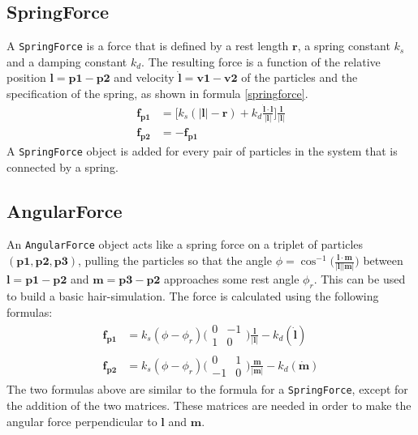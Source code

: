 \documentclass[a4paper,twoside,11pt,twocolumn]{article}
\begin{document}
\subsection{SpringForce}
A \texttt{SpringForce} is a force that is defined by a rest length $\mathbf{r}$, a spring constant $k_s$ and a damping constant $k_d$. The resulting force is a function of the relative position $\mathbf{l = p1 - p2}$ and velocity $\mathbf{\dot{l} = v1 - v2}$ of the particles and the specification of the spring, as shown in formula \ref{springforce}.
\begin{align} \label{springforce}
	\mathbf{f_{p1}} &= \bigg[k_s(|\mathbf{l}| - \mathbf{r}) + k_d \frac{\dot{\mathbf{l}}\cdot \mathbf{l}}{|\mathbf{l}|}\bigg]\frac{\mathbf{l}}{|\mathbf{l}|}\\
	\mathbf{f_{p2}} &= -\mathbf{f_{p1}}
\end{align}
A \texttt{SpringForce} object is added for every pair of particles in the system that is connected by a spring.

\subsection{AngularForce}
An \texttt{AngularForce} object acts like a spring force on a triplet of particles $(\mathbf{p1, p2, p3})$, pulling the particles so that the angle $\phi = \cos^{-1}\bigl(\frac{\mathbf{l} \cdot \mathbf{m}}{|\mathbf{l}||\mathbf{m}|}\bigr)$ between $\mathbf{l} = \mathbf{p1} - \mathbf{p2} $ and $\mathbf{m} = \mathbf{p3} - \mathbf{p2}$ approaches some rest angle $\phi_r$. This can be used to build a basic hair-simulation. The force is calculated using the following formulas:
\begin{align}
	\mathbf{f_{p1}} &= k_s (\phi - \phi_r) \biggl(\begin{matrix} 0 & -1 \\ 1 & 0\end{matrix} \biggr) \frac{\mathbf{l}}{|\mathbf{l}|} - k_d (\dot{\mathbf{l}})\\
	\mathbf{f_{p2}} &= k_s (\phi - \phi_r) \biggl(\begin{matrix} 0 & 1 \\ -1 & 0\end{matrix} \biggr) \frac{\mathbf{m}}{|\mathbf{m}|} - k_d (\dot{\mathbf{m}})
\end{align}
The two formulas above are similar to the formula for a \texttt{SpringForce}, except for the addition of the two matrices. These matrices are needed in order to make the angular force perpendicular to $\mathbf{l}$ and $\mathbf{m}$.
\end{document}
